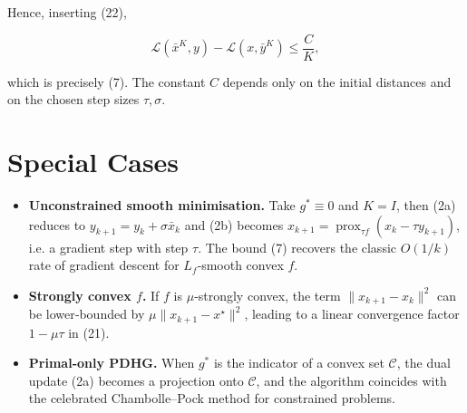 \documentclass{article}
\newcommand{\prox}{\operatorname{prox}}
\begin{document}
Hence, inserting (22),

\[
\mathcal L(\bar x^{K},y)-\mathcal L(x,\bar y^{K})
\le\frac{C}{K},
\]

which is precisely (7). The constant $C$ depends only on the initial distances and on the chosen step sizes $\tau,\sigma$.

\section*{Special Cases}
\begin{itemize}
\item \textbf{Unconstrained smooth minimisation.}  
  Take $g^{*}\equiv0$ and $K=I$, then (2a) reduces to $y_{k+1}=y_{k}+\sigma\bar x_{k}$ and (2b) becomes  
  $x_{k+1}= \prox_{\tau f}(x_{k}-\tau y_{k+1})$, i.e. a gradient step with step $\tau$.  
  The bound (7) recovers the classic $O(1/k)$ rate of gradient descent for $L_f$‑smooth convex $f$.
\item \textbf{Strongly convex $f$.}  
  If $f$ is $\mu$‑strongly convex, the term $\|x_{k+1}-x_{k}\|^{2}$ can be lower‑bounded by $\mu\|x_{k+1}-x^{\star}\|^{2}$, leading to a linear convergence factor $1-\mu\tau$ in (21).  
\item \textbf{Primal‑only PDHG.}  
  When $g^{*}$ is the indicator of a convex set $\mathcal C$, the dual update (2a) becomes a projection onto $\mathcal C$, and the algorithm coincides with the celebrated Chambolle–Pock method for constrained problems.
\end{itemize}
\end{document}
